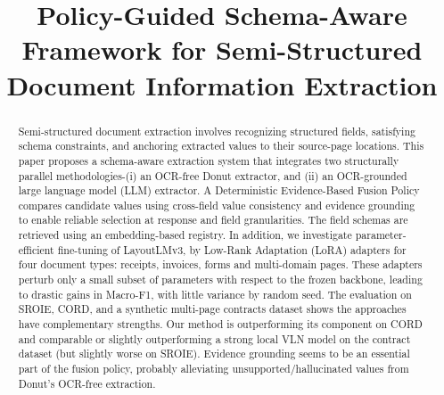 \documentclass[conference]{IEEEtran}
\begin{document}
\title{Policy-Guided Schema-Aware Framework for Semi-Structured Document Information Extraction}

\author{
\and
{}
}

\maketitle

\begin{abstract}
Semi-structured document extraction involves recognizing structured fields, satisfying schema constraints, and anchoring extracted values to their source-page locations. This paper proposes a schema-aware extraction system that integrates two structurally parallel methodologies-(i) an OCR-free Donut extractor, and (ii) an OCR-grounded large language model (LLM) extractor. A Deterministic Evidence-Based Fusion Policy compares candidate values using cross-field value consistency and evidence grounding to enable reliable selection at response and field granularities. The field schemas are retrieved using an embedding-based registry.
In addition, we investigate parameter-efficient fine-tuning of LayoutLMv3, by Low-Rank Adaptation (LoRA) adapters for four document types: receipts, invoices, forms and multi-domain pages. These adapters perturb only a small subset of parameters with respect to the frozen backbone, leading to drastic gains in Macro-F1, with little variance by random seed.
The evaluation on SROIE, CORD, and a synthetic multi-page contracts dataset shows the approaches have complementary strengths. Our method is outperforming its component on CORD and comparable or slightly outperforming a strong local VLN model on the contract dataset (but slightly worse on SROIE). Evidence grounding seems to be an essential part of the fusion policy, probably alleviating unsupported/hallucinated values from Donut's OCR-free extraction.
\end{abstract}
\end{document}
